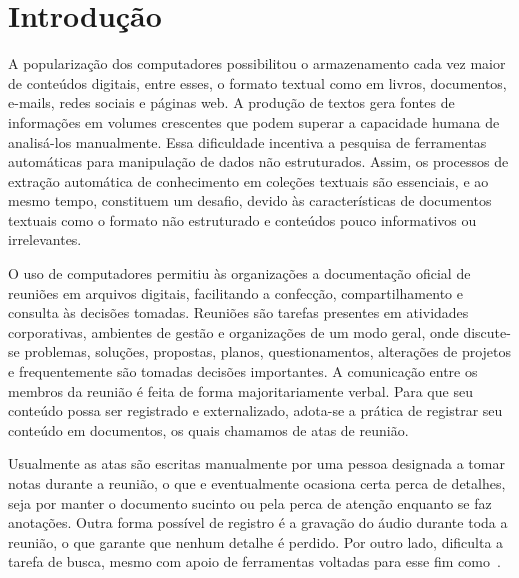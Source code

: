 \chapter{Introdução}\label{chap:introducao}



A popularização dos computadores possibilitou o armazenamento cada vez maior de conteúdos digitais, entre esses, o formato textual como em livros, documentos, e-mails, redes sociais e páginas web. A produção de textos gera fontes de informações em volumes crescentes que podem superar a capacidade humana de analisá-los manualmente. Essa dificuldade incentiva a pesquisa de ferramentas automáticas para manipulação de dados não estruturados. Assim, os processos de extração automática de conhecimento em coleções textuais são essenciais, e ao mesmo tempo, constituem um desafio, devido às características de documentos textuais como o formato não estruturado e conteúdos pouco informativos ou irrelevantes.




O uso de computadores permitiu às organizações a documentação oficial de reuniões em arquivos digitais, facilitando a confecção, compartilhamento e consulta às decisões tomadas.
% 
% 
% 
% 
Reuniões são tarefas presentes em atividades corporativas, ambientes de gestão e organizações de um modo geral, onde discute-se problemas, soluções, propostas, planos, questionamentos, alterações de projetos e frequentemente são tomadas decisões importantes. A comunicação entre os membros da reunião é feita de forma majoritariamente verbal. Para que seu conteúdo possa ser registrado e externalizado, adota-se a prática de registrar seu conteúdo em documentos, os quais chamamos de atas de reunião. 

Usualmente as atas são escritas manualmente por uma pessoa designada a tomar notas durante a reunião, o que e eventualmente ocasiona certa perca de detalhes, seja por manter o documento sucinto ou pela perca de atenção enquanto se faz anotações. Outra forma possível de registro é a gravação do áudio durante toda a reunião, o que garante que nenhum detalhe é perdido. Por outro lado, dificulta a tarefa de busca, mesmo com apoio de ferramentas voltadas para esse fim como~\cite{Schiller2009}. 


